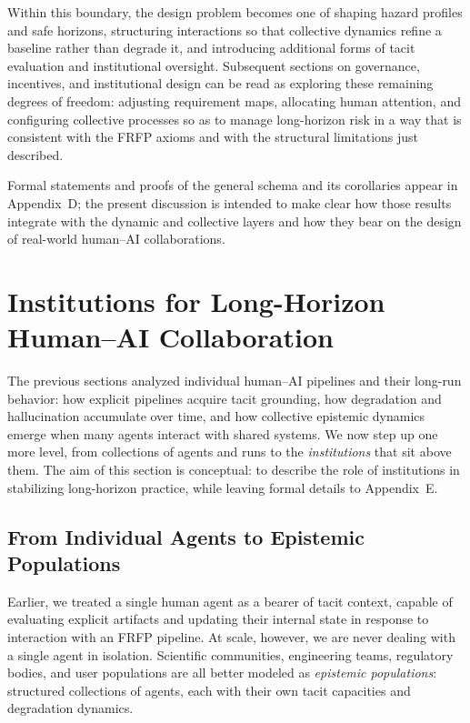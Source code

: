 \documentclass[11pt]{article}
\theoremstyle{definition}
\begin{document}
Within this boundary, the design problem becomes one of shaping hazard profiles and safe horizons, structuring interactions so that collective dynamics refine a baseline rather than degrade it, and introducing additional forms of tacit evaluation and institutional oversight. Subsequent sections on governance, incentives, and institutional design can be read as exploring these remaining degrees of freedom: adjusting requirement maps, allocating human attention, and configuring collective processes so as to manage long-horizon risk in a way that is consistent with the FRFP axioms and with the structural limitations just described.

Formal statements and proofs of the general schema and its corollaries appear in Appendix~D; the present discussion is intended to make clear how those results integrate with the dynamic and collective layers and how they bear on the design of real-world human--AI collaborations.
\section{Institutions for Long-Horizon Human--AI Collaboration}
\label{sec:institutions-main}

The previous sections analyzed individual human--AI pipelines and their long-run behavior: how explicit pipelines acquire tacit grounding, how degradation and hallucination accumulate over time, and how collective epistemic dynamics emerge when many agents interact with shared systems. We now step up one more level, from collections of agents and runs to the \emph{institutions} that sit above them. The aim of this section is conceptual: to describe the role of institutions in stabilizing long-horizon practice, while leaving formal details to Appendix~E.

\subsection{From Individual Agents to Epistemic Populations}

Earlier, we treated a single human agent as a bearer of tacit context, capable of evaluating explicit artifacts and updating their internal state in response to interaction with an FRFP pipeline. At scale, however, we are never dealing with a single agent in isolation. Scientific communities, engineering teams, regulatory bodies, and user populations are all better modeled as \emph{epistemic populations}: structured collections of agents, each with their own tacit capacities and degradation dynamics.
\end{document}
